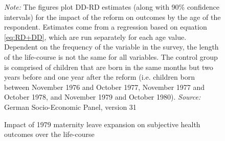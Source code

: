 \documentclass[a4paper ]{article}
\begin{document}
\begin{figure}[p]
\caption{Impact of 1979 maternity leave expansion on subjective health outcomes over the life-course}\label{fig: LC_SH}
\begin{minipage}{\textwidth} %
{\footnotesize \textit{Note:} The figures plot DD-RD estimates (along with 90\% confidence intervals) for the impact of the reform on outcomes by the age of the respondent. Estimates come from a regression based on equation \ref{eq:RD+DD}, which are run separately for each age value. Dependent on the frequency of the variable in the survey, the length of the life-course is not the same for all variables. The control group is comprised of children that are born in the same months but two years before and one year after the reform (i.e. children born between November 1976 and October 1977, November 1977 and October 1978, and November 1979 and October 1980). \newline \textit{Source: }German Socio-Economic Panel, version 31\par}
\end{minipage}
\end{figure}
\end{document}
